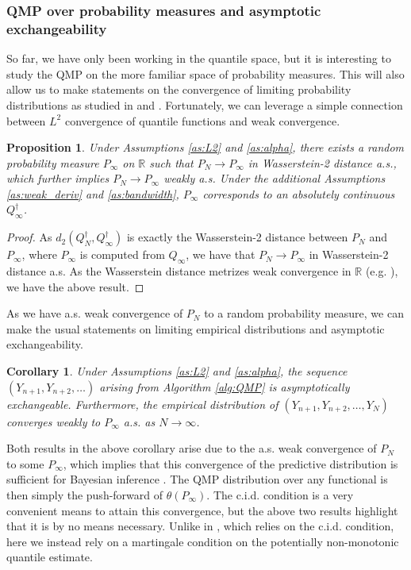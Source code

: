 \documentclass[11pt,a4paper]{article}
\newtheorem{corollary}{Corollary}
\newtheorem{proposition}{Proposition}%
\newcommand{\R}{\mathbb{R}}
\begin{document}
\subsubsection{QMP over probability measures and asymptotic exchangeability}\label{sec:prob}
So far, we have only been working in the quantile space, but it is interesting to study the QMP on the more familiar space of probability measures. This will also allow us to make  statements on the convergence of limiting probability distributions as studied in \cite{Berti2004} and \cite{Fong2023a}. Fortunately, we can leverage a simple connection between $L^2$ convergence of quantile functions and weak convergence.
\begin{proposition}
    Under {Assumptions \ref{as:L2}} and {\ref{as:alpha}}, there exists a random probability measure $P_\infty$ on $\R$ such that $P_N{\to} P_\infty$ in Wasserstein-2 distance a.s., which further implies $P_N{\to} P_\infty$ weakly a.s. Under the additional {Assumptions \ref{as:weak_deriv}} and {\ref{as:bandwidth}}, $P_\infty$ corresponds to an absolutely continuous $Q_\infty^{\dagger}$. 
\end{proposition}
\begin{proof}
    As $d_2(Q_N^{\dagger},Q_\infty^{\dagger})$ is exactly the Wasserstein-2 distance between $P_N$ and $P_\infty$, where $P_\infty$ is computed from  $Q_\infty$, we have that $P_N \to P_\infty$ in Wasserstein-2 distance a.s. As the Wasserstein distance metrizes weak convergence in $\R$ (e.g. \cite[Theorem 6.8]{Villani2009}), we have the above result. 
\end{proof}
As we have a.s. weak convergence of $P_N$ to a random probability measure, we can make the usual statements on limiting empirical distributions and asymptotic exchangeability. 
\begin{corollary}\label{cor:exchange}
     Under {Assumptions \ref{as:L2}} and {\ref{as:alpha}}, the sequence $(Y_{n+1},Y_{n+2},\ldots)$ arising from {Algorithm \ref{alg:QMP}} is asymptotically exchangeable. Furthermore, the empirical distribution of $(Y_{n+1},Y_{n+2},\ldots, Y_N)$ converges weakly to $P_\infty$ a.s. as $N \to \infty$. 
\end{corollary}
Both results in the above corollary arise due to the a.s. weak convergence of $P_N$ to some $P_\infty$, which implies that this convergence of the predictive distribution is sufficient for Bayesian inference  \citep{Fong2023a,Cui2023}. The QMP distribution over any functional is then simply the push-forward of $\theta(P_\infty)$. The c.i.d. condition is a very convenient means to attain this convergence, but the above two results highlight that it is by no means necessary. Unlike in \cite{Fong2023a}, which relies on the c.i.d. condition, here we instead rely on a martingale condition on the potentially non-monotonic quantile estimate.
\end{document}
